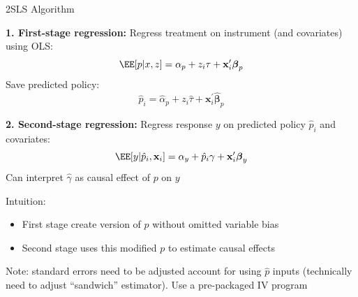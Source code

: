 \documentclass[compress, 8pt]{beamer}
\begin{document}
\begin{frame}{2SLS Algorithm}

\textbf{1. First-stage regression:}
Regress treatment on instrument (and covariates) using OLS:
\begin{equation*}
    \EE [p \vert x, z] = \alpha_p + z_i \tau + \mathbf{x}_i^\prime \boldsymbol{\beta}_p
\end{equation*}
Save predicted policy:
\begin{equation*}
    \hat{p}_i = \hat{\alpha}_p + z_i \hat{\tau} + \mathbf{x}_i^\prime \boldsymbol{\hat{\beta}}_p
\end{equation*}

\vspace{3ex}
\textbf{2. Second-stage regression:} Regress response $y$ on predicted policy $\hat{p}_i$ and covariates:
\begin{equation*}
    \EE [y \vert \hat{p}_i, \mathbf{x}_i] = \alpha_y + \hat{p}_i \gamma + \mathbf{x}_i^\prime \boldsymbol{\beta}_y
\end{equation*}
Can interpret $\hat{\gamma}$ as causal effect of $p$ on $y$

\vspace{3ex}
Intuition:
\begin{itemize}
    \item First stage create version of $p$ without omitted variable bias
    \item Second stage uses this modified $p$ to estimate causal effects
\end{itemize}

\vspace{1ex}
Note: standard errors need to be adjusted account for using $\hat{p}$ inputs (technically need to adjust ``sandwich'' estimator). Use a pre-packaged IV program
\end{frame}
\end{document}
